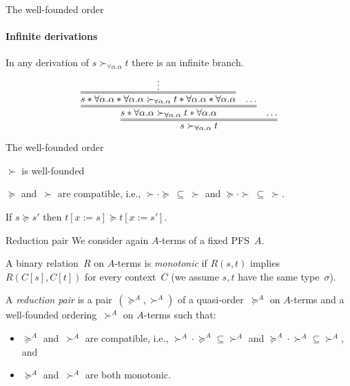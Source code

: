 \documentclass[10pt,presentation,color=names]{beamer}
\newcommand{\tapp}[2]{#1 * #2}
\newcommand{\subst}[2]{#1:=#2}
\begin{document}
\begin{frame}{The well-founded order}
  \framesubtitle{Infinite derivations}
  In any derivation of $s \succ_{\forall\alpha . \alpha} t$ there is an infinite branch.
  \[
  \infer={s \succ_{\forall \alpha . \alpha} t}{
    \infer={\tapp{s}{\forall\alpha.\alpha} \succ_{\forall \alpha . \alpha} \tapp{t}{\forall\alpha.\alpha}}{
      \infer={\tapp{\tapp{s}{\forall\alpha.\alpha}}{
          \forall \alpha . \alpha} \succ_{\forall \alpha . \alpha}\tapp{\tapp{t}{\forall\alpha.\alpha}}{\forall\alpha.\alpha}}{\vdots} &
      \ldots} &
    \ldots
  }
  \]
\end{frame}

\begin{frame}{The well-founded order}
  \begin{lemma}
    $\succ$ is well-founded
  \end{lemma}

  \pause

  \begin{lemma}[compatibility]
    $\succeq$ and~$\succ$ are compatible, i.e., $\succ \cdot
    \succeq\ \subseteq\ \succ$ and $\succeq \cdot
    \succ\ \subseteq\ \succ$.
  \end{lemma}

  \pause

  \begin{lemma}
    If $s \succeq s'$ then $t[\subst{x}{s}] \succeq t[\subst{x}{s'}]$.
  \end{lemma}
\end{frame}

\begin{frame}{Reduction pair}
  We consider again $A$-terms of a fixed PFS~$A$.\pause

  \begin{definition}
    A binary relation~$R$ on $A$-terms is \emph{monotonic} if $R(s, t)$
    implies $R(C[s], C[t])$ for every context~$C$ (we assume $s,t$ have
    the same type~$\sigma$).

    A \emph{reduction pair} is a pair~$(\succeq^A,\succ^A)$ of a
    quasi-order~$\succeq^A$ on $A$-terms and a well-founded
    ordering~$\succ^A$ on $A$-terms such that:
    \begin{itemize}
    \item
      $\succeq^A$ and~$\succ^A$ are compatible, i.e., ${\succ^A} \cdot
      {\succeq^A} \subseteq {\succ^A}$ and ${\succeq^A} \cdot {\succ^A}
      \subseteq {\succ^A}$, and
    \item $\succeq^A$ and~$\succ^A$ are both monotonic.
    \end{itemize}
  \end{definition}
\end{frame}
\end{document}
